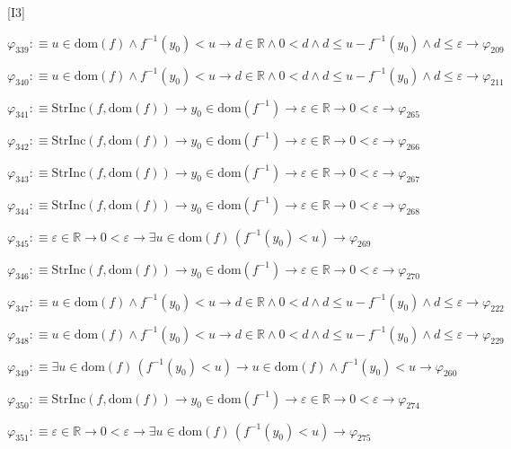 \begin{fullproof}{[I3]}
\begin{abbrevlist}
\item $\varphi_{339} :\equiv u \in \mathrm{dom}(f) \land f^{-1}(y_{0}) < u \to d \in \mathbb{R} \land 0 < d \land d \leq u - f^{-1}(y_{0}) \land d \leq \varepsilon \to \varphi_{209}$
\item $\varphi_{340} :\equiv u \in \mathrm{dom}(f) \land f^{-1}(y_{0}) < u \to d \in \mathbb{R} \land 0 < d \land d \leq u - f^{-1}(y_{0}) \land d \leq \varepsilon \to \varphi_{211}$
\item $\varphi_{341} :\equiv \mathrm{StrInc}(f,\mathrm{dom}(f)) \to y_{0} \in \mathrm{dom}(f^{-1}) \to \varepsilon \in \mathbb{R} \to 0 < \varepsilon \to \varphi_{265}$
\item $\varphi_{342} :\equiv \mathrm{StrInc}(f,\mathrm{dom}(f)) \to y_{0} \in \mathrm{dom}(f^{-1}) \to \varepsilon \in \mathbb{R} \to 0 < \varepsilon \to \varphi_{266}$
\item $\varphi_{343} :\equiv \mathrm{StrInc}(f,\mathrm{dom}(f)) \to y_{0} \in \mathrm{dom}(f^{-1}) \to \varepsilon \in \mathbb{R} \to 0 < \varepsilon \to \varphi_{267}$
\item $\varphi_{344} :\equiv \mathrm{StrInc}(f,\mathrm{dom}(f)) \to y_{0} \in \mathrm{dom}(f^{-1}) \to \varepsilon \in \mathbb{R} \to 0 < \varepsilon \to \varphi_{268}$
\item $\varphi_{345} :\equiv \varepsilon \in \mathbb{R} \to 0 < \varepsilon \to \exists u \in \mathrm{dom}(f)\,(f^{-1}(y_{0}) < u) \to \varphi_{269}$
\item $\varphi_{346} :\equiv \mathrm{StrInc}(f,\mathrm{dom}(f)) \to y_{0} \in \mathrm{dom}(f^{-1}) \to \varepsilon \in \mathbb{R} \to 0 < \varepsilon \to \varphi_{270}$
\item $\varphi_{347} :\equiv u \in \mathrm{dom}(f) \land f^{-1}(y_{0}) < u \to d \in \mathbb{R} \land 0 < d \land d \leq u - f^{-1}(y_{0}) \land d \leq \varepsilon \to \varphi_{222}$
\item $\varphi_{348} :\equiv u \in \mathrm{dom}(f) \land f^{-1}(y_{0}) < u \to d \in \mathbb{R} \land 0 < d \land d \leq u - f^{-1}(y_{0}) \land d \leq \varepsilon \to \varphi_{229}$
\item $\varphi_{349} :\equiv \exists u \in \mathrm{dom}(f)\,(f^{-1}(y_{0}) < u) \to u \in \mathrm{dom}(f) \land f^{-1}(y_{0}) < u \to \varphi_{260}$
\item $\varphi_{350} :\equiv \mathrm{StrInc}(f,\mathrm{dom}(f)) \to y_{0} \in \mathrm{dom}(f^{-1}) \to \varepsilon \in \mathbb{R} \to 0 < \varepsilon \to \varphi_{274}$
\item $\varphi_{351} :\equiv \varepsilon \in \mathbb{R} \to 0 < \varepsilon \to \exists u \in \mathrm{dom}(f)\,(f^{-1}(y_{0}) < u) \to \varphi_{275}$

\end{abbrevlist}
\end{fullproof}
